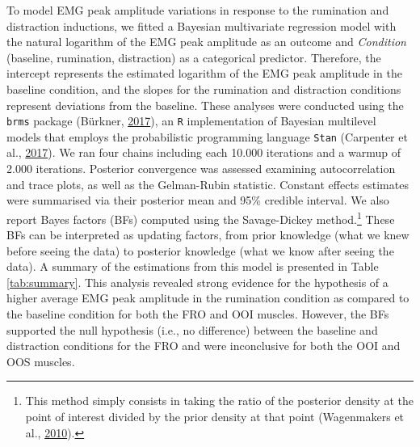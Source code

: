 \documentclass[
  english,
  man, donotrepeattitle,floatsintext]{apa6}
\begin{document}
To model EMG peak amplitude variations in response to the rumination and distraction inductions, we fitted a Bayesian multivariate regression model with the natural logarithm of the EMG peak amplitude as an outcome and \emph{Condition} (baseline, rumination, distraction) as a categorical predictor. Therefore, the intercept represents the estimated logarithm of the EMG peak amplitude in the baseline condition, and the slopes for the rumination and distraction conditions represent deviations from the baseline. These analyses were conducted using the \texttt{brms} package (Bürkner, \protect\hyperlink{ref-R-brms}{2017}), an \texttt{R} implementation of Bayesian multilevel models that employs the probabilistic programming language \texttt{Stan} (Carpenter et al., \protect\hyperlink{ref-carpenter_stan_2017}{2017}). We ran four chains including each 10.000 iterations and a warmup of 2.000 iterations. Posterior convergence was assessed examining autocorrelation and trace plots, as well as the Gelman-Rubin statistic. Constant effects estimates were summarised via their posterior mean and 95\% credible interval. We also report Bayes factors (BFs) computed using the Savage-Dickey method.\footnote{This method simply consists in taking the ratio of the posterior density at the point of interest divided by the prior density at that point (Wagenmakers et al., \protect\hyperlink{ref-wagenmakers_bayesian_2010}{2010}).} These BFs can be interpreted as updating factors, from prior knowledge (what we knew before seeing the data) to posterior knowledge (what we know after seeing the data). A summary of the estimations from this model is presented in Table \ref{tab:summary}. This analysis revealed strong evidence for the hypothesis of a higher average EMG peak amplitude in the rumination condition as compared to the baseline condition for both the FRO and OOI muscles. However, the BFs supported the null hypothesis (i.e., no difference) between the baseline and distraction conditions for the FRO and were inconclusive for both the OOI and OOS muscles.
\end{document}
